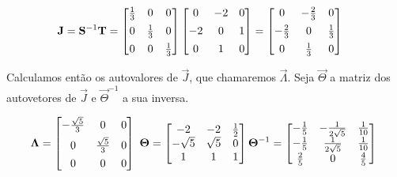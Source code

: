 \documentclass{homework}
\begin{document}
\begin{enumerate}[wide, leftmargin=80pt]
			\begin{align*}
			\vec{J} = \vec{S}^{-1}\vec{T} &= \left[
			\begin{array}{@{}ccc@{}}
			\frac{1}{3} & 0 & 0 \\[1ex]
			0 & \frac{1}{3} & 0 \\[1ex]
			0 & 0 & \frac{1}{3}
			\end{array}
			\right]
			\left[\begin{array}{@{}ccc@{}}
			0 & -2 & 0 \\[1ex]
			-2 & 0 & 1 \\[1ex]
			0 & 1 & 0
			\end{array}\right] = \left[\begin{array}{@{}ccc@{}}
			0 & -\frac{2}{3} & 0 \\[1ex]
			-\frac{2}{3} & 0 & \frac{1}{3} \\[1ex]
			0 & \frac{1}{3} & 0
			\end{array}
			\right]
			\end{align*}
			
			Calculamos então os autovalores de $\vec{J}$, que chamaremos $\vec{\Lambda}$. Seja $\vec{\Theta}$ a matriz dos autovetores de $\vec{J}$ e $\vec{\Theta}^{-1}$ a sua inversa.
			
			\begin{align*}
				\vec{\Lambda} = \left[
				\begin{array}{@{}ccc@{}}
				-\frac{\sqrt{5}}{3} & 0 & 0 \\[1ex]
				0 & \frac{\sqrt{5}}{3} & 0 \\[1ex]
				0 & 0 & 0 \\
				\end{array}
				\right]~%
				\vec{\Theta} = \left[ %
				\begin{array}{@{}ccc@{}}
				-2 & -2 & \frac{1}{2} \\
				-\sqrt{5} & \sqrt{5} & 0 \\
				1 & 1 & 1 \\
				\end{array}
				\right] %
				\vec{\Theta}^{-1} = \left[
				\begin{array}{@{}ccc@{}}
				-\frac{1}{5} & -\frac{1}{2 \sqrt{5}} & \frac{1}{10} \\
				-\frac{1}{5} & \frac{1}{2 \sqrt{5}} & \frac{1}{10} \\
				\frac{2}{5} & 0 & \frac{4}{5} \\
				\end{array}
				\right]~
			\end{align*}
			

\end{enumerate}
\end{document}
